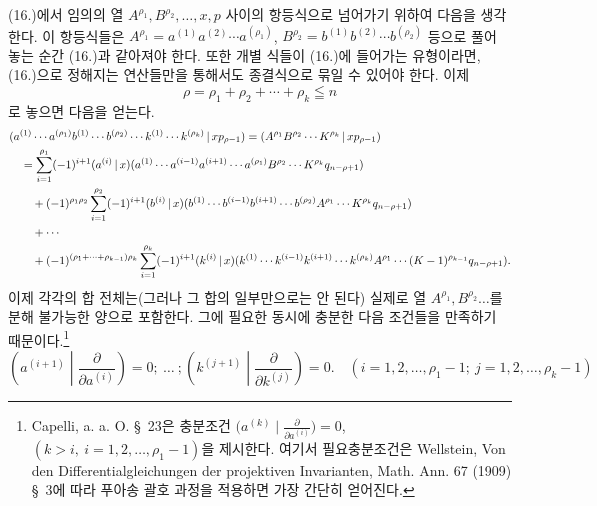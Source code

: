 (16.)에서 임의의 열 $A^{\rho_1},B^{\rho_2},\ldots,x,p$ 사이의 항등식으로 넘어가기 위하여 다음을 생각한다. 이 항등식들은 $A^{\rho_1}=a^{(1)}a^{(2)}\cdots a^{(\rho_1)}$, $B^{\rho_2}=b^{(1)}b^{(2)}\cdots b^{(\rho_2)}$ 등으로 풀어 놓는 순간 (16.)과 같아져야 한다. 또한 개별 식들이 (16.)에 들어가는 유형이라면, (16.)으로 정해지는 연산들만을 통해서도 종결식으로 묶일 수 있어야 한다. 이제
\begin{equation}
 \rho=\rho_1+\rho_2+\cdots+\rho_k\leqq n
\tag{18}
\end{equation}
로 놓으면 다음을 얻는다.
\begin{align*}
&(a^{(1)}\cdots a^{(\rho_1)}b^{(1)}\cdots b^{(\rho_2)}\cdots k^{(1)}\cdots k^{(\rho_k)}\,|\,xp_{\rho-1})
  =(A^{\rho_1}B^{\rho_2}\cdots K^{\rho_k}\,|\,xp_{\rho-1}) \\
&\quad=\sum_{i=1}^{\rho_1}(-1)^{i+1}(a^{(i)}\,|\,x)(a^{(1)}\cdots a^{(i-1)}a^{(i+1)}\cdots a^{(\rho_1)}B^{\rho_2}\cdots K^{\rho_k}q_{n-\rho+1})\\
&\qquad+(-1)^{\rho_1\rho_2}\sum_{i=1}^{\rho_2}(-1)^{i+1}(b^{(i)}\,|\,x)(b^{(1)}\cdots b^{(i-1)}b^{(i+1)}\cdots b^{(\rho_2)}A^{\rho_1}\cdots K^{\rho_k}q_{n-\rho+1})\\
&\qquad+\cdots\\
&\qquad+(-1)^{(\rho_1+\cdots+\rho_{k-1})\rho_k}\sum_{i=1}^{\rho_k}(-1)^{i+1}(k^{(i)}\,|\,x)(k^{(1)}\cdots k^{(i-1)}k^{(i+1)}\cdots k^{(\rho_k)}A^{\rho_1}\cdots (K-1)^{\rho_{k-1}}q_{n-\rho+1}).
\end{align*}
이제 각각의 합 전체는(그러나 그 합의 일부만으로는 안 된다) 실제로 열 $A^{\rho_1},B^{\rho_2}\ldots$를 분해 불가능한 양으로 포함한다. 그에 필요한 동시에 충분한 다음 조건들을 만족하기 때문이다.\footnote{Capelli, a. a. O. \S\ 23은 충분조건 $\bigl(a^{(k)}\mid \frac{\partial}{\partial a^{(i)}}\bigr)=0$, $(k>i,\ i=1,2,\ldots,\rho_1-1)$을 제시한다. 여기서 필요충분조건은 Wellstein, Von den Differentialgleichungen der projektiven Invarianten, Math. Ann. 67 (1909) \S\ 3에 따라 푸아송 괄호 과정을 적용하면 가장 간단히 얻어진다.}
\begin{equation}
 \left(a^{(i+1)}\middle|\frac{\partial}{\partial a^{(i)}}\right)=0;\ \ldots\ ;
 \left(k^{(j+1)}\middle|\frac{\partial}{\partial k^{(j)}}\right)=0.
 \quad (i=1,2,\ldots,\rho_1-1;\ j=1,2,\ldots,\rho_k-1)
\tag{19}
\end{equation}

